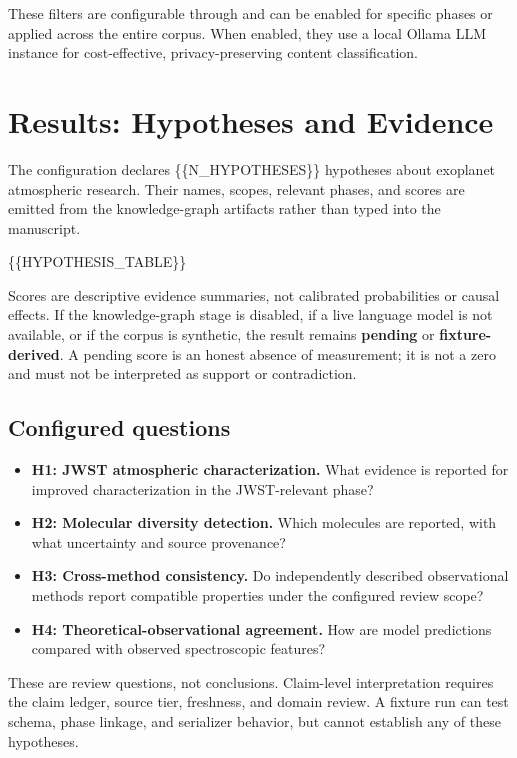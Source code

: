 \documentclass[
]{article}
\providecommand{\tightlist}{%
  \setlength{\itemsep}{0pt}\setlength{\parskip}{0pt}}
\begin{document}
These filters are configurable through 
and can be enabled for specific phases or applied across the entire
corpus. When enabled, they use a local Ollama LLM instance for
cost-effective, privacy-preserving content classification.

\newpage

\section{Results: Hypotheses and
Evidence}\label{results-hypotheses-and-evidence}

The configuration declares \{\{N\_HYPOTHESES\}\} hypotheses about
exoplanet atmospheric research. Their names, scopes, relevant phases,
and scores are emitted from the knowledge-graph artifacts rather than
typed into the manuscript.

\{\{HYPOTHESIS\_TABLE\}\}

Scores are descriptive evidence summaries, not calibrated probabilities
or causal effects. If the knowledge-graph stage is disabled, if a live
language model is not available, or if the corpus is synthetic, the
result remains \textbf{pending} or \textbf{fixture-derived}. A pending
score is an honest absence of measurement; it is not a zero and must not
be interpreted as support or contradiction.

\subsection{Configured questions}\label{configured-questions}

\begin{itemize}
\tightlist
\item
  \textbf{H1: JWST atmospheric characterization.} What evidence is
  reported for improved characterization in the JWST-relevant phase?
\item
  \textbf{H2: Molecular diversity detection.} Which molecules are
  reported, with what uncertainty and source provenance?
\item
  \textbf{H3: Cross-method consistency.} Do independently described
  observational methods report compatible properties under the
  configured review scope?
\item
  \textbf{H4: Theoretical-observational agreement.} How are model
  predictions compared with observed spectroscopic features?
\end{itemize}

These are review questions, not conclusions. Claim-level interpretation
requires the claim ledger, source tier, freshness, and domain review. A
fixture run can test schema, phase linkage, and serializer behavior, but
cannot establish any of these hypotheses.
\end{document}
